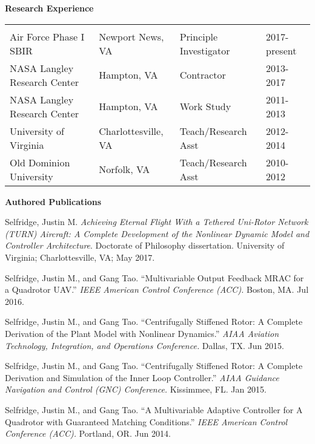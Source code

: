 \documentclass[11pt]{article}
\newcommand{\PubSpace}{\vspace{-0.12cm}}  %
\begin{document}
{\bf Research Experience} \\
\begin{tabular}{llll}
\vspace{-0.15in}
\hspace{2.2in} &
\hspace{1.3in} &
\hspace{1.3in} &
\hspace{0.0in} \\
Air Force Phase I SBIR &
Newport News, VA &
Principle Investigator &
2017-present \\
NASA Langley Research Center &
Hampton, VA &
Contractor &
2013-2017 \\
NASA Langley Research Center &
Hampton, VA &
Work Study &
2011-2013 \\
University of Virginia &
Charlottesville, VA &
Teach/Research Asst &
2012-2014 \\
Old Dominion University &
Norfolk, VA &
Teach/Research Asst &
2010-2012
\end{tabular}


{\bf Authored Publications} \\
\vspace{-0.2in}

\PubSpace
Selfridge, Justin M.
\emph{Achieving Eternal Flight With a Tethered Uni-Rotor Network (TURN) Aircraft: A Complete Development of the Nonlinear Dynamic Model and Controller Architecture}.
Doctorate of Philosophy dissertation.
University of Virginia; Charlottesville, VA;
May 2017.

\PubSpace
Selfridge, Justin M., and Gang Tao.
``Multivariable Output Feedback MRAC for a Quadrotor UAV.''
\emph{IEEE American Control Conference (ACC).}
Boston, MA.
Jul 2016.

\PubSpace
Selfridge, Justin M., and Gang Tao.
``Centrifugally Stiffened Rotor: A Complete Derivation of the Plant Model with Nonlinear Dynamics.''
\emph{AIAA Aviation Technology, Integration, and Operations Conference.}
Dallas, TX.
Jun 2015.

\PubSpace
Selfridge, Justin M., and Gang Tao.
``Centrifugally Stiffened Rotor: A Complete Derivation and Simulation of the Inner Loop Controller.''
\emph{AIAA Guidance Navigation and Control (GNC) Conference.}
Kissimmee, FL.
Jan 2015.

\PubSpace
Selfridge, Justin M., and Gang Tao.
``A Multivariable Adaptive Controller for A Quadrotor with Guaranteed Matching Conditions.''
\emph{IEEE American Control Conference (ACC).}
Portland, OR.
Jun 2014.
\end{document}
